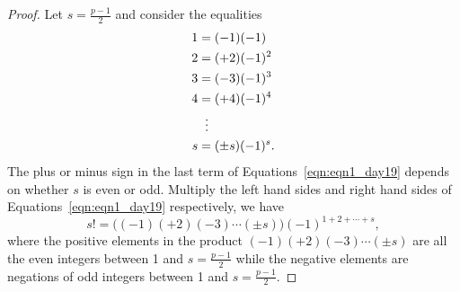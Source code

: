 \documentclass{amsbook}
\theoremstyle{plain}
\theoremstyle{definition}
\theoremstyle{remark}
\numberwithin{equation}{chapter}
\numberwithin{figure}{chapter}
\begin{document}
\begin{proof}
  Let $s = \frac{p-1}2$ and consider the equalities
  \begin{align}\label{eqn:eqn1_day19}
    \begin{split}
      1 &= (-1)(-1) \\
      2 &= (+2)(-1)^2 \\
      3 &= (-3)(-1)^3 \\
      4 &= (+4)(-1)^4 \\
      & \hspace{2mm}\vdots \\
      s &= (\pm s)(-1)^s.
    \end{split}
  \end{align}
  The plus or minus sign in the last term of Equations~\eqref{eqn:eqn1_day19} depends on whether $s$ is even or odd. Multiply the left hand sides and right hand sides of Equations~\eqref{eqn:eqn1_day19} respectively, we have
  \[
    s! = \Big( (-1)(+2)(-3)\cdots(\pm s) \Big) (-1)^{1+2+\cdots +s},
  \]
  where the positive elements in the product $(-1)(+2)(-3)\cdots(\pm s)$ are all the even integers between 1 and $s = \frac{p-1}2$ while the negative elements are negations of odd integers between 1 and $s = \frac{p-1}2$.


\end{proof}
\end{document}
